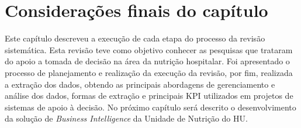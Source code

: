 \section{Considerações finais do capítulo}
Este capítulo descreveu a execução de cada etapa do processo da revisão sistemática. Esta revisão teve como objetivo conhecer as pesquisas que trataram do apoio a tomada de decisão na área da nutrição hospitalar. Foi apresentado o processo de planejamento e realização da execução da revisão, por fim, realizada a extração dos dados, obtendo as principais abordagens de gerenciamento e análise dos dados, formas de extração e principais KPI utilizados em projetos de sistemas de apoio à decisão. No próximo capítulo será descrito o desenvolvimento da solução de \textit{Business Intelligence} da Unidade de Nutrição do HU.